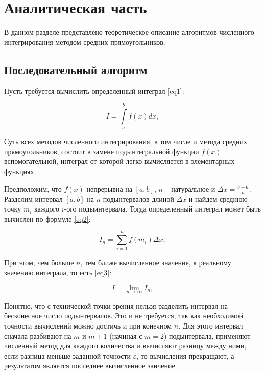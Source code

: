 \chapter{Аналитическая часть}

В данном разделе представлено теоретическое описание алгоритмов численного
интегрирования методом средних прямоугольников.

\section{Последовательный алгоритм}

Пусть требуется вычислить определенный интеграл \ref{eq1}:

\begin{equation}\label{eq1}
    I = \int\limits_a^b f(x)dx,
\end{equation}

Суть всех методов численного интегрирования, в том числе и метода средних
прямоугольников, состоит в замене подынтегральной функции $f(x)$
вспомогательной, интеграл от которой легко вычисляется в элементарных функциях.

Предположим, что $f(x)$ непрерывна на $[a,b]$, $n$ -- натуральное и $\Delta x =
\frac{b-a}{n}$. Разделим интервал $[a,b]$ на $n$ подынтервалов длиной $\Delta
x$ и найдем среднюю точку $m_i$ каждого $i$-ого подыинтервала\cite{int}. Тогда
определенный интеграл может быть вычислен по формуле \ref{eq2}:
    
\begin{equation}\label{eq2}
    I_n = \sum\limits_{i=1}^{n} f(m_i) \Delta x,
\end{equation}

При этом, чем больше $n$, тем ближе вычисленное значение,
к реальному значению интеграла, то есть \ref{eq3}:

\begin{equation}\label{eq3}
    I = \lim\limits_{n \to \infty} I_n,
\end{equation}

Понятно, что с технической точки зрения нельзя разделить интервал на
бесконесное число подынтервалов. Это и не требуется, так как необходимой
точности вычислений можно достичь и при конечном $n$. Для этого интервал сначала
разбивают на $m$ и $m + 1$ (начиная с $m=2$) подынтервала, применяют численный
метод для каждого количества и вычисляют разницу между ними, если разница
меньше заданной точности $\varepsilon$, то вычисления прекращают, а результатом
является последнее вычисленное занчение.

